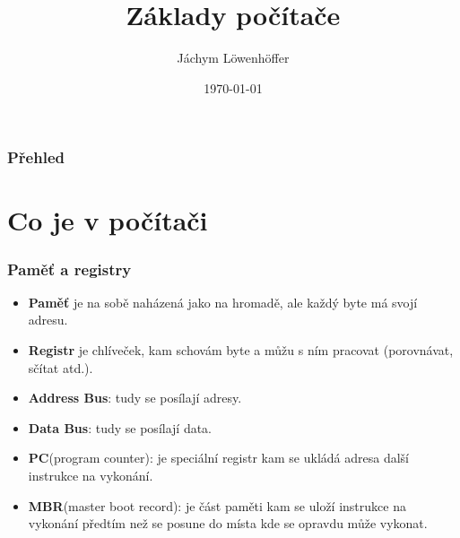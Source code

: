 \documentclass{beamer}
\title[amogus]{Základy počítače} %
\author{Jáchym Löwenhöffer} %
\institute[GEVO] %
{
Gynekologická Evaluace Velkých Obrazů \\ %
\medskip
\textit{jachym.lowenhoffer@gmail.com} %
}
\date{\today} %
\begin{document}
\begin{frame}
	\titlepage %
\end{frame}

\begin{frame}
	\frametitle{Přehled} %
	\tableofcontents %
\end{frame}


\section{Co je v počítači} %



\begin{frame}
	\frametitle{Paměť a registry}
	\begin{itemize}
		\item \textbf{Paměť} je na sobě naházená jako na hromadě, ale každý byte má svojí
		      adresu.
		\item  \textbf{Registr} je chlíveček, kam schovám byte a můžu s ním pracovat
		      (porovnávat, sčítat atd.).
		\item \textbf{Address Bus}: tudy se posílají adresy.
		\item \textbf{Data Bus}: tudy se posílají data.
		\item \textbf{PC}(program counter): je speciální registr kam se ukládá adresa další instrukce
		 na vykonání.
		\item \textbf{MBR}(master boot record): je část paměti kam se uloží
		 instrukce na vykonání předtím než se posune do místa kde se opravdu může
		 vykonat.
	\end{itemize}
\end{frame}
\end{document}
